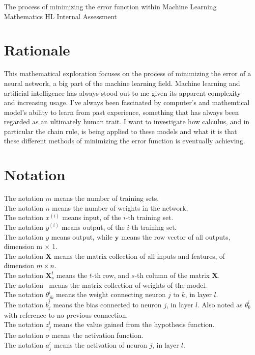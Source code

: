\documentclass[a4paper,12pt]{article}
\begin{document}
\begin{center}
\Huge The process of minimizing the error function within Machine Learning \\
\small Mathematics HL Internal Assessment
\end{center}

\section{Rationale}
This mathematical exploration focuses on the process of minimizing the error of a neural network, a big part of the machine learning field. Machine learning and artificial intelligence has always stood out to me given its apparent complexity and increasing usage. I've always been fascinated by computer's and mathemtical model's ability to learn from past experience, something that has always been regarded as an ultimately human trait. I want to investigate how calculus, and in particular the chain rule, is being applied to these models and what it is that these different methods of minimizing the error function is eventually achieving. 

\section{Notation}
The notation \(m\) means the number of training sets. \\
The notation \(n\) means the number of weights in the network.  \\
The notation $x^{(i)}$ means input, of the $i$-th training set.  \\
The notation $y^{(i)}$ means output, of the $i$-th training set.  \\
The notation $y$ means output, while $\boldsymbol{y}$ means the row vector of all outputs, dimension m $\times$ 1. \\
The notation $\boldsymbol{X}$ means the matrix collection of all inputs and features, of dimension $m \times n$.\\
The notation $\boldsymbol{X}^t_s$ means the $t$-th row, and $s$-th column of the matrix $\boldsymbol{X}$. \\
The notation \boldmath{$\Theta$}\unboldmath \ means the matrix collection of weights of the model. \\
The notation $\theta_{jk}^l$ means the weight connecting neuron $j$ to $k$, in layer $l$. \\
The notation $b_j^l$ means the bias connected to neuron $j$, in layer $l$. Also noted as $\theta^l_0$ with reference to no previous connection.\\
The notation $z_j^l$ means the value gained from the hypothesis function. \\
The notation $\sigma$ means the activation function. \\
The notation $a^l_j$ means the activation of neuron $j$, in layer $l$. 
\end{document}
